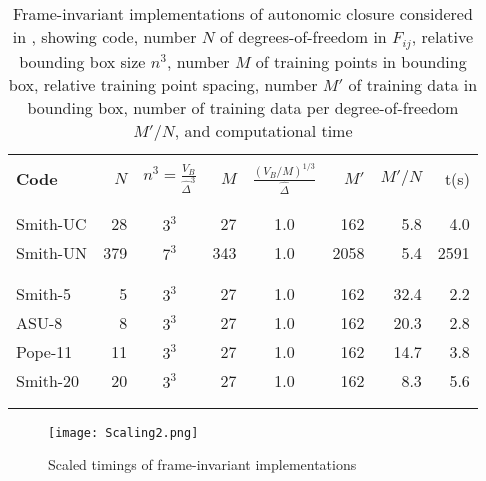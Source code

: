 %
%

\begin{table}[tb]
	\label{tab:2}
	\centering

	\caption{Frame-invariant implementations of autonomic closure considered in , showing code, number $N$ of degrees-of-freedom in $F_{ij}$, relative bounding box size $n^3$, number $M$ of training points in bounding box, relative training point spacing, number $M'$ of training data in bounding box, number of training data per degree-of-freedom $M'/N$, and computational time  \vspace{0.5cm}}

	\begin{tabular}{lrcrcrrr}
	\hline \\

	\textbf{Code} & 
	$N$ & 
	$n^3 = \frac{V_B}{\widehat{\Delta}^3}$ & 
	$M$ &
	$\frac{(V_B/M)^{1/3}}{\widehat{\Delta}}$ &
	$M'$ & 
	$M'/N$ & 
	t(s)	\\ \\

	\hline \\
		Smith-UC	&	28	&	$3^3$	&	27	&	1.0	&	162	&	5.8	& 4.0	\\
		Smith-UN	&	379	&	$7^3$	&	343	&	1.0 &	2058&	5.4	& 2591	\\ \\
	\hline \\
		Smith-5		&	5	&	$3^3$	&	27	&	1.0	&	162	&	32.4 & 2.2	\\
		ASU-8		&	8	&	$3^3$	&	27	&	1.0	&	162	&	20.3 & 2.8	\\ 
		Pope-11		&	11	&	$3^3$	&	27	&	1.0 &	162	&	14.7 & 3.8	\\ 
		Smith-20	&	20	&	$3^3$	&	27	&	1.0 &	162	&	8.3	 & 5.6	\\ \\
	\hline	\\
	\end{tabular}	
\end{table}

%
%         


 


%
\begin{figure}
	\begin{center} 
	\texttt{[image: Scaling2.png]}
	\caption{Scaled timings of frame-invariant implementations}
	\label{F:comp_time}
	\end{center}
\end{figure}
%
%






